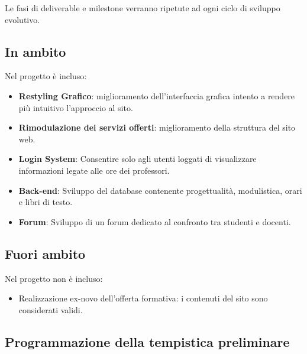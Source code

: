 \documentclass{article}
\begin{document}
\begin{flushleft}
\begin{itemize}
		\end{itemize}
        
        Le fasi di deliverable e milestone verranno ripetute ad ogni ciclo di sviluppo evolutivo.\\
        
    
		\subsection{In ambito}

		Nel progetto è incluso:\\

	    \begin{itemize}

			\item \textbf{Restyling Grafico}: miglioramento dell'interfaccia grafica intento a rendere più intuitivo l'approccio al sito. 

			\item \textbf{Rimodulazione dei servizi offerti}: miglioramento della struttura del sito web.

			\item \textbf{Login System}: Consentire solo agli utenti loggati di visualizzare informazioni legate alle ore dei professori.

			\item \textbf{Back-end}: Sviluppo del database contenente progettualità, modulistica, orari e libri di testo.
			
			\item \textbf{Forum}: Sviluppo di un forum dedicato al confronto tra  studenti e docenti.

		\end{itemize}

		\subsection{Fuori ambito}

		Nel progetto non è incluso:

		\begin{itemize}

			\item Realizzazione ex-novo dell'offerta formativa: i contenuti del sito sono considerati validi.

		\end{itemize}

		\vspace{2mm}

		\subsection{Programmazione della tempistica preliminare}


\end{flushleft}
\end{document}
